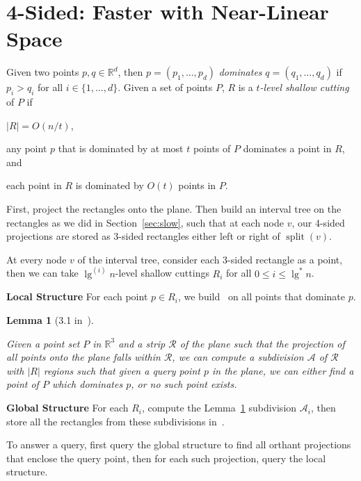 \documentclass[letterpaper,12pt,twocolumn]{article}
\newcommand\lspace{\hspace{-0.5em}}
\DeclareMathOperator{\splt}{split}
\newcommand{\BigOh}[1]{O\!\left(#1\right)}
\newcommand\IR{\mathbb{R}}
\theoremstyle{plain}
\newtheorem{lemma}{Lemma}
\begin{document}
\section{\lspace{} 4-Sided: Faster with Near-Linear Space}
\label{sec:4sided}

Given two points $p,q \in \IR^d$, then $p = (p_1, \ldots, p_d)$
\emph{dominates} $q = (q_1, \ldots, q_d)$ if $p_i > q_i$ for all $i
\in \{1, \ldots, d \}$.  Given a set of points $P$, $R$ is a
\emph{$t$-level shallow cutting} of $P$ if
%
\begin{enumerate*}[label=(\roman*)] %
\item $|R| = \BigOh{n/t}$,
\item any point $p$ that is dominated by at most $t$ points of $P$
  dominates a point in $R$, and
\item each point in $R$ is dominated by $\BigOh{t}$ points in $P$.
\end{enumerate*}
%
First, project the rectangles onto the plane.  Then build an interval
tree on the rectangles as we did in Section~\ref{sec:slow}, such that
at each node $v$, our 4-sided projections are stored as 3-sided
rectangles either left or right of $\splt(v)$.

At every node $v$ of the interval tree, consider each 3-sided
rectangle as a point, then we can take $\lg^{(i)} n$-level shallow
cuttings $R_i$ for all $0 \le i \le \lg^* n$.

\textbf{Local Structure} For each point $p \in R_i$, we
build~\cite{afshani2008dominance} on all points that dominate $p$.

\begin{lemma}[3.1 in~\cite{rahul2015improved}]\label{lem:31}

  Given a point set $P$ in $\IR^3$ and a strip $\mathcal{R}$ of the
  plane such that the projection of all points onto the plane falls
  within $\mathcal{R}$, we can compute a subdivision $\mathcal{A}$ of
  $\mathcal{R}$ with $|R|$ regions such that given a query point $p$
  in the plane, we can either find a point of $P$ which dominates $p$,
  or no such point exists.

\end{lemma}

\textbf{Global Structure} For each $R_i$, compute the
Lemma~\ref{lem:31} subdivision $\mathcal{A}_i$, then store all the
rectangles from these subdivisions in~\cite{chazelle1986filtering}.

To answer a query, first query the global structure to find all
orthant projections that enclose the query point, then for each such
projection, query the local structure.
\end{document}
